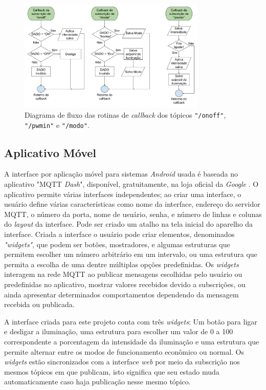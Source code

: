 \begin{figure}[ht]
    \begin{center}
    \includegraphics[width=0.8\textwidth]{figuras/flux_cb.png}
    \end{center}
    \caption[Diagrama de fluxo das rotinas de \textit{callback}.]{Diagrama de fluxo das rotinas de \textit{callback} dos tópicos \texttt{"/onoff"}, \texttt{"/pwmin"} e \texttt{"/modo"}.}
    \label{fcb}
\end{figure}

\subsection{Aplicativo Móvel}

A interface por aplicação móvel para sistemas \textit{Android} usada é baseada no aplicativo "MQTT \textit{Dash}", disponível, gratuitamente, na loja oficial da \textit{Google} \cite{dash}. O aplicativo permite várias interfaces independentes; ao criar uma interface, o usuário define várias características como nome da interface, endereço do servidor MQTT, o número da porta, nome de usuário, senha, e número de linhas e colunas do \textit{layout} da interface. Pode ser criado um atalho na tela inicial do aparelho da interface. Criada a interface o usuário pode criar elementos, denominados \textit{"widgets"}, que podem ser botões, mostradores, e algumas estruturas que permitem escolher um número arbitrário em um intervalo, ou uma estrutura que permita a escolha de uma dentre múltiplas opções predefinidas. Os \textit{widgets} interagem na rede MQTT ao publicar mensagens escolhidas pelo usuário ou predefinidas no aplicativo, mostrar valores recebidos devido a subscrições, ou ainda apresentar determinados comportamentos dependendo da mensagem recebida ou publicada.

A interface criada para este projeto conta com três \textit{widgets}: Um botão para ligar e desligar a iluminação, uma estrutura para escolher um valor de 0 a 100 correspondente a porcentagem da intensidade da iluminação e uma estrutura que permite alternar entre os modos de funcionamento econômico ou normal. Os \textit{widgets} estão sincronizados com a interface \textit{web} por meio da subscrição nos mesmos tópicos em que publicam, isto significa que seu estado muda automaticamente caso haja publicação nesse mesmo tópico.

